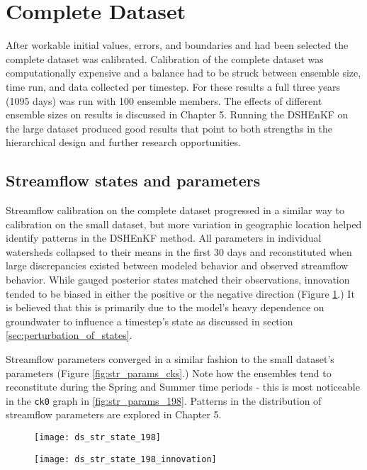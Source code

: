 \pagebreak

\section{Complete Dataset}

After workable initial values, errors, and boundaries and had been selected the complete dataset was calibrated. Calibration of the complete dataset was computationally expensive and a balance had to be struck between ensemble size, time run, and data collected per timestep. For these results a full three years (1095 days) was run with 100 ensemble members. The effects of different ensemble sizes on results is discussed in Chapter 5. Running the DSHEnKF on the large dataset produced good results that point to both strengths in the hierarchical design and further research opportunities.

\subsection{Streamflow states and parameters}

Streamflow calibration on the complete dataset progressed in a similar way to calibration on the small dataset, but more variation in geographic location helped identify patterns in the DSHEnKF method. All parameters in individual watersheds collapsed to their means in the first 30 days and reconstituted when large discrepancies existed between modeled behavior and observed streamflow behavior. While gauged posterior states matched their observations, innovation tended to be biased in either the positive or the negative direction (Figure \ref{fig:str_state_296}.) It is believed that this is primarily due to the model's heavy dependence on groundwater to influence a timestep's state as discussed in section \autoref{sec:perturbation_of_states}.

Streamflow parameters converged in a similar fashion to the small dataset's parameters (Figure \ref{fig:str_params_cks}.) Note how the ensembles tend to reconstitute during the Spring and Summer time periods - this is most noticeable in the \texttt{ck0} graph in \ref{fig:str_params_198}. Patterns in the distribution of streamflow parameters are explored in Chapter 5.

\begin{figure}
\centering
\begin{minipage}{.48\textwidth}
  \centering
  \texttt{[image: ds\_str\_state\_198]}
  \label{fig:296str}
\end{minipage}%
\begin{minipage}{.48\textwidth}
  \centering
  \texttt{[image: ds\_str\_state\_198\_innovation]}
  \label{fig:296strinnovation}
\end{minipage}
\label{fig:str_state_296}
\end{figure}

